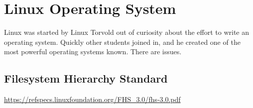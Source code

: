 \section{Linux Operating System}

Linux was started by Linux Torvold out of curiosity about the effort to
write an operating system. Quickly other students joined in, and he
created one of the most powerful operating systems known. There are issues.



\subsection{Filesystem Hierarchy Standard}

\url{https://refspecs.linuxfoundation.org/FHS_3.0/fhs-3.0.pdf}
